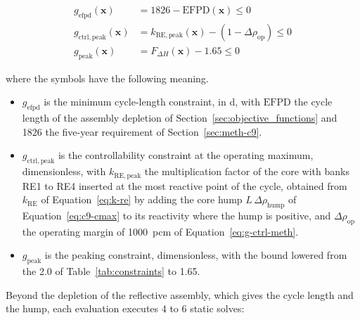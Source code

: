 \begin{align}
g_\mathrm{efpd}(\mathbf{x}) &= 1826 - \mathrm{EFPD}(\mathbf{x}) \le 0
\label{eq:c9-g-efpd} \\
g_\mathrm{ctrl,peak}(\mathbf{x}) &= k_\mathrm{RE,peak}(\mathbf{x}) - (1 - \Delta\rho_\mathrm{op}) \le 0
\label{eq:c9-g-ctrl-peak} \\
g_\mathrm{peak}(\mathbf{x}) &= F_{\Delta H}(\mathbf{x}) - 1.65 \le 0
\label{eq:c9-g-peak}
\end{align}

\noindent where the symbols have the following meaning.

\begin{itemize}
  \item $g_\mathrm{efpd}$ is the minimum cycle-length constraint, in d,
        with $\mathrm{EFPD}$ the cycle length of the assembly depletion
        of Section~\ref{sec:objective_functions} and 1826 the five-year
        requirement of Section~\ref{sec:meth-c9}.

  \item $g_\mathrm{ctrl,peak}$ is the controllability constraint at the
        operating maximum, dimensionless, with $k_\mathrm{RE,peak}$ the
        multiplication factor of the core with banks RE1 to RE4
        inserted at the most reactive point of the cycle, obtained from
        $k_\mathrm{RE}$ of Equation~\eqref{eq:k-re} by adding the core
        hump $L\,\Delta\rho_\mathrm{hump}$ of
        Equation~\eqref{eq:c9-cmax} to its reactivity where the hump is
        positive, and $\Delta\rho_\mathrm{op}$ the operating margin of
        \SI{1000}{pcm} of Equation~\eqref{eq:g-ctrl-meth}.

  \item $g_\mathrm{peak}$ is the peaking constraint, dimensionless,
        with the bound lowered from the 2.0 of
        Table~\ref{tab:constraints} to 1.65.
\end{itemize}

Beyond the depletion of the reflective assembly, which gives the cycle
length and the hump, each evaluation executes 4 to 6 static
solves:

